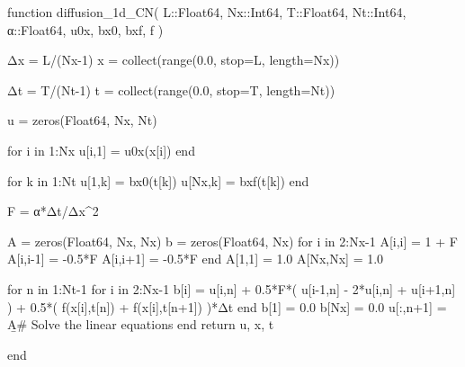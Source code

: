 \documentclass[a4paper,11pt]{article}
\begin{document}
\begin{juliacode}
function diffusion_1d_CN(
    L::Float64, Nx::Int64, T::Float64, Nt::Int64,
    α::Float64, u0x, bx0, bxf, f
)

    Δx = L/(Nx-1)
    x = collect(range(0.0, stop=L, length=Nx))

    Δt = T/(Nt-1)
    t = collect(range(0.0, stop=T, length=Nt))

    u = zeros(Float64, Nx, Nt)

    for i in 1:Nx
        u[i,1] = u0x(x[i])
    end

    for k in 1:Nt
        u[1,k] = bx0(t[k])
        u[Nx,k] = bxf(t[k])
    end

    F = α*Δt/Δx^2

    A = zeros(Float64, Nx, Nx)
    b = zeros(Float64, Nx)
    for i in 2:Nx-1
        A[i,i] = 1 + F
        A[i,i-1] = -0.5*F
        A[i,i+1] = -0.5*F
    end
    A[1,1] = 1.0
    A[Nx,Nx] = 1.0

    for n in 1:Nt-1
        for i in 2:Nx-1
            b[i] = u[i,n] + 0.5*F*( u[i-1,n] - 2*u[i,n] + u[i+1,n] ) +
                   0.5*( f(x[i],t[n]) + f(x[i],t[n+1]) )*Δt
        end
        b[1] = 0.0
        b[Nx] = 0.0
        u[:,n+1] = A\b  # Solve the linear equations
    end
    return u, x, t

end
\end{juliacode}








\end{document}
